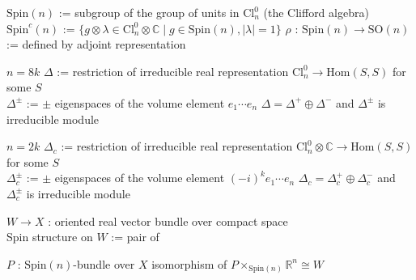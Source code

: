 \begin{Definition}[スピン群とスピン表現]
\itemdefi
  \Define \(\text{Spin}(n)\) := subgroup of the group of units in \(\text{Cl}^0_n\) (the Clifford algebra) \\
  \Define \(\text{Spin}^c(n)\) := \(\{ g \otimes \lambda \in \text{Cl}^0_n \otimes \mathbb{C} \mid g \in \text{Spin}(n) , \lvert \lambda \rvert = 1\}\)
\itemdefi
  \Define \(\rho\) : \(\text{Spin}(n) \to \text{SO}(n)\) := defined by adjoint representation
\end{Definition}

\begin{Definition}
\itemwhen
  \IfHold \(n = 8k\)
\itemdefi
  \(\Delta\) := restriction of irreducible real representation \(\text{Cl}^0_n \to \text{Hom}(S,S)\) for some \(S\) \\
  \(\Delta^{\pm}\) := \(\pm\) eigenspaces of the volume element \(e_1 \cdots e_n\)
\itemprop
  \(\Delta = \Delta^+ \oplus \Delta^-\) and \(\Delta^{\pm}\) is irreducible module
\end{Definition}

\begin{Definition}
\itemwhen
  \IfHold \(n = 2k\)
\itemdefi
  \(\Delta_c\) := restriction of irreducible real representation \(\text{Cl}^0_n \otimes \mathbb{C} \to \text{Hom}(S,S)\) for some \(S\) \\
  \(\Delta_c^{\pm}\) := \(\pm\) eigenspaces of the volume element \((-i)^k e_1 \cdots e_n\)
\itemprop
  \(\Delta_c = \Delta_c^+ \oplus \Delta_c^-\) and \(\Delta_c^{\pm}\) is irreducible module
\end{Definition}

\begin{Definition}[スピン構造]
\itemdefi
  \For \(W \to X\) : oriented real vector bundle over compact space \\
  \Define Spin structure on \(W\) := pair of
  \begin{itemize}
    \itemenum \(P\) : \(\text{Spin}(n)\)-bundle over \(X\)
    \itemenum isomorphism of \(P \times_{\text{Spin}(n)} \mathbb{R}^n \cong W\)
  \end{itemize}
\end{Definition}

